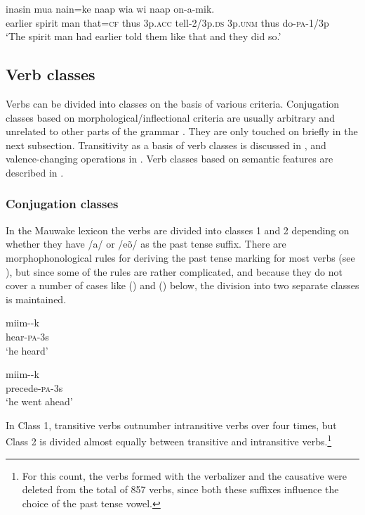 \ea%
\label{ex:x1033}
\gll {} inasin mua nain=ke naap wia  wi naap on-a-mik.\\
earlier spirit man that=\textsc{cf} thus 3p.\textsc{acc} tell-2/3p.\textsc{ds} 3p.\textsc{unm} thus do-\textsc{pa}-1/3p\\
\glt `The spirit man had earlier told them like that and they did so.'
\z

\subsection{Verb classes} 
{}
Verbs can be divided into classes on the basis of various criteria. Conjugation classes based on morphological/inflectional criteria are usually arbitrary and unrelated to other parts of the grammar \citep[191]{Anderson1985b}. They are only touched on briefly in the next subsection. Transitivity as a basis of verb classes is discussed in , and valence-changing operations in . Verb classes based on semantic features are described in .

\subsubsection[Conjugation classes]{Conjugation classes}
{}
In the Mauwake lexicon the verbs are divided into classes 1 and 2 depending on whether they have /a/ or /e\~{o}/ as the past tense suffix. There are morphophonological rules for deriving the past tense marking for most verbs (see ), but since some of the rules are rather complicated, and because they do not cover a number of cases like () and () below, the division into two separate classes is maintained.

\ea%
\label{ex:x253}
\gll miim--k \\
hear-\textsc{pa}-3s \\
\glt`he heard'
\z

\ea%
\label{ex:x254}
\gll miim--k \\
precede-\textsc{pa}-3s \\
\glt`he went ahead'
\z

In Class 1, transitive verbs outnumber intransitive verbs over four times, but Class 2 is divided almost equally between transitive and intransitive verbs.\footnote{For this count, the verbs formed with the verbalizer  and the causative  were deleted from the total of 857 verbs, since both these suffixes influence the choice of the past tense vowel.}

